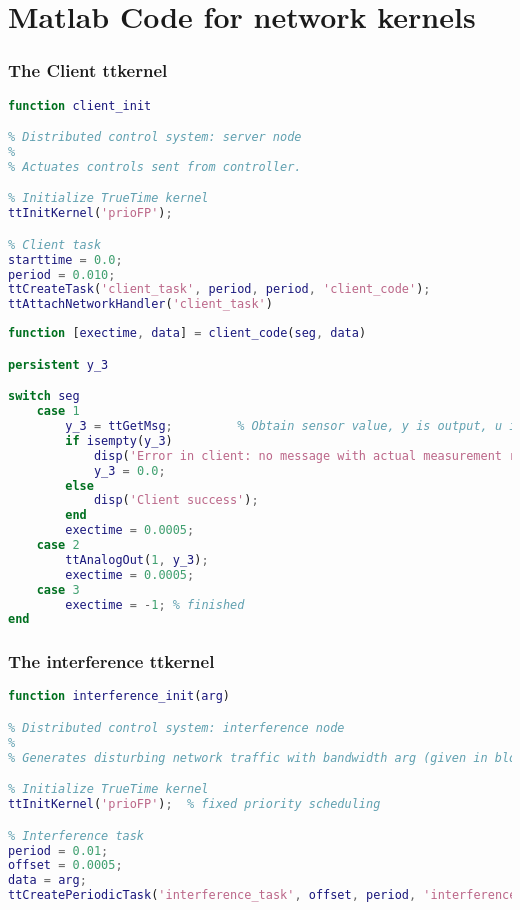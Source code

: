 \appendix

\chapter{Matlab Code for network kernels}
\label{chapter:Appendix1}

\subsection{The Client ttkernel}

\begin{lstlisting}[language=Matlab, caption={client\textunderscore init.m}, label={listing:client_init}]
function client_init

% Distributed control system: server node
%
% Actuates controls sent from controller.

% Initialize TrueTime kernel
ttInitKernel('prioFP');   

% Client task
starttime = 0.0;
period = 0.010;
ttCreateTask('client_task', period, period, 'client_code');
ttAttachNetworkHandler('client_task')

\end{lstlisting}


\begin{lstlisting}[language=Matlab, caption={client\textunderscore code.m}, label={listing:client_code}]
function [exectime, data] = client_code(seg, data)

persistent y_3

switch seg
    case 1
        y_3 = ttGetMsg;         % Obtain sensor value, y is output, u is input
        if isempty(y_3)
            disp('Error in client: no message with actual measurement received!');
            y_3 = 0.0;
        else
            disp('Client success');
        end
        exectime = 0.0005;
    case 2
        ttAnalogOut(1, y_3);
        exectime = 0.0005;
    case 3
        exectime = -1; % finished
end
\end{lstlisting}

\subsection{The interference ttkernel}

\begin{lstlisting}[language=Matlab, caption={interference\textunderscore init.m}, label={listing:interference_init}]
function interference_init(arg)

% Distributed control system: interference node
%
% Generates disturbing network traffic with bandwidth arg (given in block mask)

% Initialize TrueTime kernel
ttInitKernel('prioFP');  % fixed priority scheduling

% Interference task
period = 0.01; 
offset = 0.0005;
data = arg;
ttCreatePeriodicTask('interference_task', offset, period, 'interference_code', data);

\end{lstlisting}

